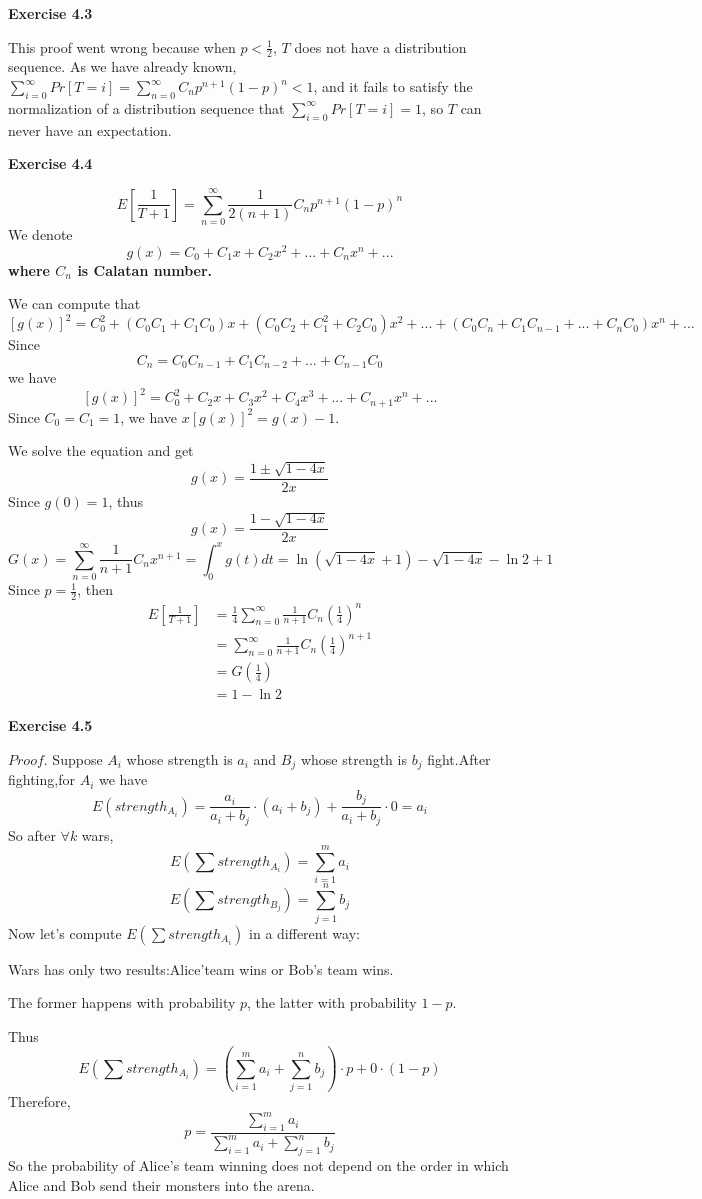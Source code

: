 \documentclass{article} %
\begin{document}
	\textbf{Exercise 4.3}\par
	This proof went wrong because when $p<\frac{1}{2}$, $T$ does not have a distribution sequence. As we have already known, $\sum_{i=0}^{\infty} Pr[T=i]=\sum_{n=0}^{\infty} C_n p^{n+1}(1-p)^n<1$, and it fails to satisfy the normalization of a distribution sequence that $\sum_{i=0}^{\infty} Pr[T=i]=1$, so $T$ can never have an expectation.
	
	\textbf{Exercise 4.4}\par
	$$E[\frac{1}{T+1}]=\sum_{n=0}^\infty \frac{1}{2(n+1)}C_{n}p^{n+1}(1-p)^{n}$$
	We denote $$g(x)=C_0+C_1x+C_2x^2+...+C_{n}x^{n}+...$$ \textbf{where $C_{n}$ is Calatan number.}\par
	We can compute that $$[g(x)]^2=C_0^2+(C_0C_1+C_1C_0)x+(C_0C_2+C_1^2+C_2C_0)x^2+...+(C_0C_{n}+C_1C_{n-1}+...+C_{n}C_0)x^{n}+...$$
	Since $$C_{n}=C_0C_{n-1}+C_1C_{n-2}+...+C_{n-1}C_0$$
	we have $$[g(x)]^2=C_0^2+C_2x+C_3x^2+C_4x^3+...+C_{n+1}x^{n}+...$$
	Since $C_0=C_1=1$, we have $x[g(x)]^2=g(x)-1$.\par
	We solve the equation and get
	$$g(x)=\frac{1\pm\sqrt{1-4x}}{2x}$$
	Since $g(0)=1$, thus 
	$$g(x)=\frac{1-\sqrt{1-4x}}{2x}$$
	$$G(x)=\sum_{n=0}^\infty \frac{1}{n+1}C_{n}x^{n+1}=\int_{0}^{x} g(t)dt=\ln(\sqrt{1-4x}+1)-\sqrt{1-4x}-\ln 2+1$$
	Since $p=\frac{1}{2}$, then 
	\begin{align*}
	E[\frac{1}{T+1}]&=\frac{1}{4}\sum_{n=0}^\infty \frac{1}{n+1}C_{n}(\frac{1}{4})^n\\
	&=\sum_{n=0}^\infty \frac{1}{n+1}C_{n}(\frac{1}{4})^{n+1}\\
	&=G(\frac{1}{4})\\
	&=1-\ln 2
	\end{align*}

    \textbf{Exercise 4.5}\par
    $Proof$.
    Suppose $A_i$ whose strength is $a_i$ and $B_j$ whose strength is $b_j$ fight.After fighting,for $A_i$ we have
    $$
    E(strength_{A_i})=\frac{a_i}{a_i+b_j}\cdot (a_i+b_j)+\frac{b_j}{a_i+b_j}\cdot 0=a_i
    $$
    So after $\forall k$ wars,
    $$
    E(\sum strength_{A_i})=\sum_{i=1}^{m}a_i
    $$
    $$
    E(\sum strength_{B_j})=\sum_{j=1}^{n}b_j
    $$
    Now let's compute $E(\sum strength_{A_i})$ in a different way:\par
    Wars has only two results:Alice'team wins or Bob's team wins.\par
    The former happens with probability $p$,
    the latter with probability $1-p$.\par
    Thus
    $$
    E(\sum strength_{A_i})=(\sum_{i=1}^{m}a_i+\sum_{j=1}^{n}b_j)\cdot p+0\cdot (1-p)
    $$
    Therefore,
    $$
    p=\frac{\sum_{i=1}^{m}a_i}{\sum_{i=1}^{m}a_i+\sum_{j=1}^{n}b_j}
    $$
    So the probability of Alice's team winning does not depend on the order in which Alice and Bob send their monsters into the arena.
 
\end{document}
